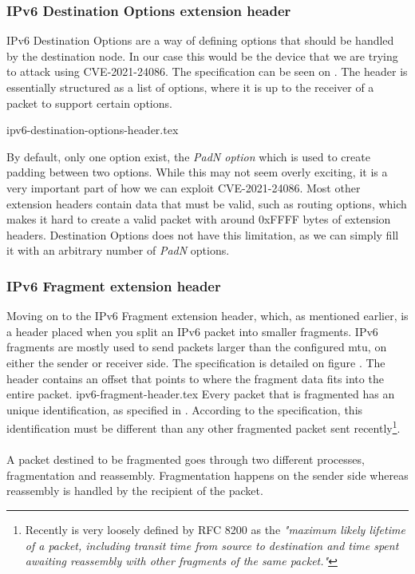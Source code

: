 \documentclass{report}
\begin{document}
\subsubsection{IPv6 Destination Options extension header}
IPv6 Destination Options are a way of defining options that should be handled by the destination node. In our case this would be the device that we are trying to attack using CVE-2021-24086. The specification can be seen on . The header is essentially structured as a list of options, where it is up to the receiver of a packet to support certain options.

{ipv6-destination-options-header.tex}

By default, only one option exist, the \emph{PadN option}\cite[sec. 4.2]{url:rfc:ipv6} which is used to create padding between two options. While this may not seem overly exciting, it is a very important part of how we can exploit CVE-2021-24086. Most other extension headers contain data that must be valid, such as routing options, which makes it hard to create a valid packet with around 0xFFFF bytes of extension headers. Destination Options does not have this limitation, as we can simply fill it with an arbitrary number of \emph{PadN} options.

\subsubsection{IPv6 Fragment extension header}
Moving on to the IPv6 Fragment extension header, which, as mentioned earlier, is a header placed when you split an IPv6 packet into smaller fragments. IPv6 fragments are mostly used to send packets larger than the configured \gls{mtu}, on either the sender or receiver side. The specification is detailed on figure . The header contains an offset that points to where the fragment data fits into the entire packet.
{ipv6-fragment-header.tex}
Every packet that is fragmented has an unique identification, as specified in . According to the specification\cite[sec. 4.5]{url:rfc:ipv6}, this identification must be different than any other fragmented packet sent recently\footnote{Recently is very loosely defined by RFC 8200\cite{url:rfc:ipv6} as the \emph{"maximum likely lifetime of a packet, including transit time from source to destination and time spent awaiting reassembly with other fragments of the same packet."}\cite[sec. 4.5]{url:rfc:ipv6}}.
\\
\\
A packet destined to be fragmented goes through two different processes, fragmentation and reassembly. Fragmentation happens on the sender side whereas reassembly is handled by the recipient of the packet.
\end{document}
